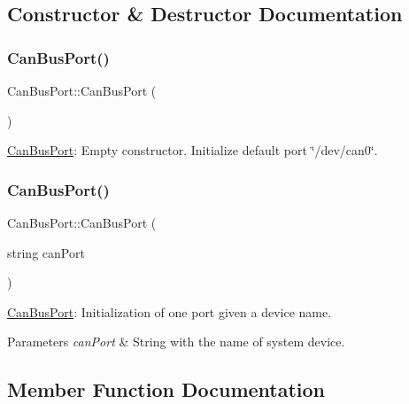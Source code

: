 \subsection{Constructor \& Destructor Documentation}
\mbox{\label{classCanBusPort_a4ccb8d39da6185bfe5c1dee38db51987}} 
\subsubsection{\texorpdfstring{Can\+Bus\+Port()}{CanBusPort()}\hspace{0.1cm}{\footnotesize\ttfamily [1/2]}}
{\footnotesize\ttfamily Can\+Bus\+Port\+::\+Can\+Bus\+Port (\begin{DoxyParamCaption}{ }\end{DoxyParamCaption})}



\hyperlink{classCanBusPort}{Can\+Bus\+Port}\+: Empty constructor. Initialize default port \char`\"{}/dev/can0\char`\"{}. 

\mbox{\label{classCanBusPort_ad4649a2da594bbffc267483646fb1405}} 
\subsubsection{\texorpdfstring{Can\+Bus\+Port()}{CanBusPort()}\hspace{0.1cm}{\footnotesize\ttfamily [2/2]}}
{\footnotesize\ttfamily Can\+Bus\+Port\+::\+Can\+Bus\+Port (\begin{DoxyParamCaption}\item[{string}]{can\+Port }\end{DoxyParamCaption})}



\hyperlink{classCanBusPort}{Can\+Bus\+Port}\+: Initialization of one port given a device name. 


\begin{DoxyParams}{Parameters}
{\em can\+Port} & String with the name of system device. \\
\hline
\end{DoxyParams}


\subsection{Member Function Documentation}
\mbox{\label{classCanBusPort_ac442e4e5b7bb154ea6322518b715f406}} 
